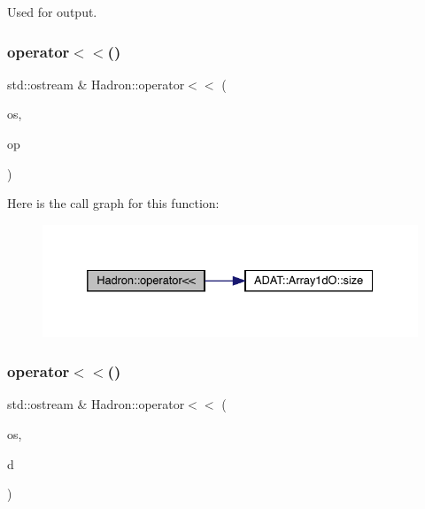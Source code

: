 Used for output. 

\mbox{\label{namespaceHadron_a0dfff614f40f815cfb78d828c07bc8aa}} 
\subsubsection{\texorpdfstring{operator$<$$<$()}{operator<<()}\hspace{0.1cm}{\footnotesize\ttfamily [32/48]}}
{\footnotesize\ttfamily std\+::ostream \& Hadron\+::operator$<$$<$ (\begin{DoxyParamCaption}\item[{std\+::ostream \&}]{os,  }\item[{const \mbox{\hyperlink{structHadron_1_1KeySingleHadronQuarkSpin__t}{Key\+Single\+Hadron\+Quark\+Spin\+\_\+t}} \&}]{op }\end{DoxyParamCaption})}

Here is the call graph for this function\+:
\nopagebreak
\begin{figure}[H]
\begin{center}
\leavevmode
\includegraphics[width=332pt]{d1/daf/namespaceHadron_a0dfff614f40f815cfb78d828c07bc8aa_cgraph}
\end{center}
\end{figure}
\mbox{\label{namespaceHadron_a6d4dd7ed7a6efa27888f4ea9bdd20e51}} 
\subsubsection{\texorpdfstring{operator$<$$<$()}{operator<<()}\hspace{0.1cm}{\footnotesize\ttfamily [33/48]}}
{\footnotesize\ttfamily std\+::ostream \& Hadron\+::operator$<$$<$ (\begin{DoxyParamCaption}\item[{std\+::ostream \&}]{os,  }\item[{const \mbox{\hyperlink{structHadron_1_1KeyHadronNPartIrrepOp__t}{Key\+Hadron\+N\+Part\+Irrep\+Op\+\_\+t}} \&}]{d }\end{DoxyParamCaption})}



